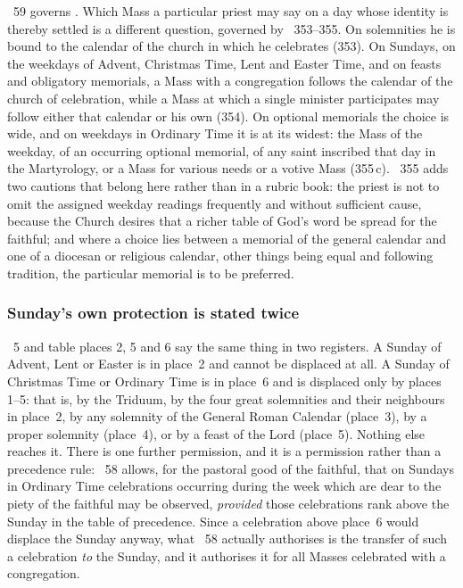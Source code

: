 ~59 governs . Which Mass a particular priest may
say on a day whose identity is thereby settled is a different question, governed by
~353--355. On solemnities he is bound to the calendar of the church in which he celebrates
(353). On Sundays, on the weekdays of Advent, Christmas Time, Lent and Easter Time, and on feasts
and obligatory memorials, a Mass with a congregation follows the calendar of the church of
celebration, while a Mass at which a single minister participates may follow either that calendar or
his own (354). On optional memorials the choice is wide, and on weekdays in Ordinary Time it is at
its widest: the Mass of the weekday, of an occurring optional memorial, of any saint inscribed that
day in the Martyrology, or a Mass for various needs or a votive Mass (355\,c). ~355 adds
two cautions that belong here rather than in a rubric book: the priest is not to omit the assigned
weekday readings frequently and without sufficient cause, because the Church desires that a richer
table of God's word be spread for the faithful; and where a choice lies between a memorial of the
general calendar and one of a diocesan or religious calendar, other things being equal and following
tradition, the particular memorial is to be preferred.

\subsubsection{Sunday's own protection is stated twice}

~5 and table places 2, 5 and 6 say the same thing in two registers. A Sunday of Advent,
Lent or Easter is in place~2 and cannot be displaced at all. A Sunday of Christmas Time or Ordinary
Time is in place~6 and is displaced only by places 1--5: that is, by the Triduum, by the four great
solemnities and their neighbours in place~2, by any solemnity of the General Roman Calendar
(place~3), by a proper solemnity (place~4), or by a feast of the Lord (place~5). Nothing else
reaches it. There is one further permission, and it is a permission rather than a precedence rule:
~58 allows, for the pastoral good of the faithful, that on Sundays in Ordinary Time
celebrations occurring during the week which are dear to the piety of the faithful may be observed,
\emph{provided} those celebrations rank above the Sunday in the table of precedence. Since a
celebration above place~6 would displace the Sunday anyway, what ~58 actually authorises
is the transfer of such a celebration \emph{to} the Sunday, and it authorises it for all Masses
celebrated with a congregation.
